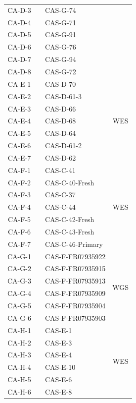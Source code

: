 \begin{table}[!ht]
\begin{tabular}{c|c|l|c}
CA-D-3 & & CAS-G-74 &  \\ 
CA-D-4 & & CAS-G-71 &  \\ 
CA-D-5 & & CAS-G-91 &  \\ 
CA-D-6 & & CAS-G-76 &  \\ 
CA-D-7 & & CAS-G-94 &  \\ 
CA-D-8 & & CAS-G-72 &  \\ 
\cline{1-1}\cline{3-4}
CA-E-1 & & CAS-D-70 & \multirow{7}{*}{WES}\\ 
CA-E-2 & & CAS-D-61-3 &  \\ 
CA-E-3 & & CAS-D-66 &  \\ 
CA-E-4 & & CAS-D-68 &  \\ 
CA-E-5 & & CAS-D-64 &  \\ 
CA-E-6 & & CAS-D-61-2 &  \\ 
CA-E-7 & & CAS-D-62 &  \\ 
\cline{1-1}\cline{3-4}
CA-F-1 & & CAS-C-41 & \multirow{7}{*}{WES}\\ 
CA-F-2 & & CAS-C-40-Fresh &  \\ 
CA-F-3 & & CAS-C-37 &  \\ 
CA-F-4 & & CAS-C-44 &  \\ 
CA-F-5 & & CAS-C-42-Fresh &  \\ 
CA-F-6 & & CAS-C-43-Fresh &  \\ 
CA-F-7 & & CAS-C-46-Primary &  \\ 
\cline{1-1}\cline{3-4}
CA-G-1 & & CAS-F-FR07935922 & \multirow{6}{*}{WGS}\\ 
CA-G-2 & & CAS-F-FR07935915 &  \\ 
CA-G-3 & & CAS-F-FR07935913 &  \\ 
CA-G-4 & & CAS-F-FR07935909 &  \\ 
CA-G-5 & & CAS-F-FR07935904 &  \\ 
CA-G-6 & & CAS-F-FR07935903 &  \\ 
\cline{1-1}\cline{3-4}
CA-H-1 & & CAS-E-1 & \multirow{6}{*}{WES}\\ 
CA-H-2 & & CAS-E-3 &  \\ 
CA-H-3 & & CAS-E-4 &  \\ 
CA-H-4 & & CAS-E-10 &  \\ 
CA-H-5 & & CAS-E-6 &  \\ 
CA-H-6 & & CAS-E-8 &  \\ 
\hline
\end{tabular}
\end{table}

\clearpage

